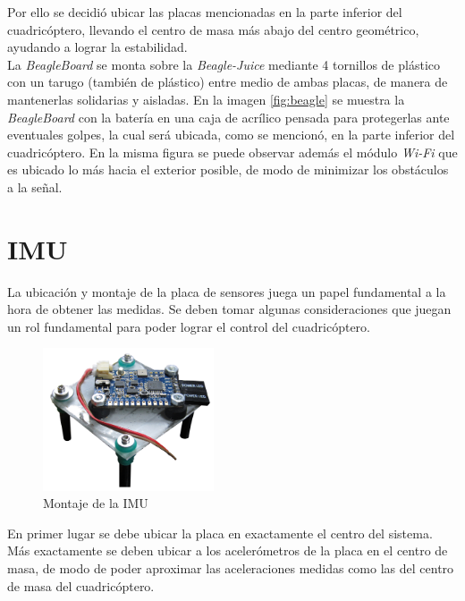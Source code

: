\documentclass[main]{subfiles}
\begin{document}
Por ello se decidió ubicar las placas mencionadas en la parte inferior del cuadricóptero, llevando el centro de masa más abajo del centro geométrico, ayudando a lograr la estabilidad.\\

La \emph{BeagleBoard} se monta sobre la \emph{Beagle-Juice} mediante 4 tornillos de plástico con un tarugo (también de plástico) entre medio de ambas placas, de manera de mantenerlas solidarias y aisladas. En la imagen \ref{fig:beagle} se muestra la \emph{BeagleBoard} con la batería en una caja de acrílico pensada para protegerlas ante eventuales golpes, la cual será ubicada, como se mencionó, en la parte inferior del cuadricóptero. En la misma figura se puede observar además el módulo \emph{Wi-Fi} que es ubicado lo más hacia el exterior posible, de modo de minimizar los obstáculos a la señal.

\section*{IMU}

La ubicación y montaje de la placa de sensores juega un papel fundamental a la hora de obtener las medidas. Se deben tomar algunas consideraciones que juegan un rol fundamental para poder lograr el control del cuadricóptero.\\

\begin{figure}
	\begin{center}
		\includegraphics[width=0.45\textwidth]{./pics_montaje/imu.jpg}
	\end{center}
	\caption{Montaje de la IMU}
	\label{fig:imu}
\end{figure}

En primer lugar se debe ubicar la placa en exactamente el centro del sistema. Más exactamente se deben ubicar a los acelerómetros de la placa en el centro de masa, de modo de poder aproximar las aceleraciones medidas como las del centro de masa del cuadricóptero.\\
\end{document}
